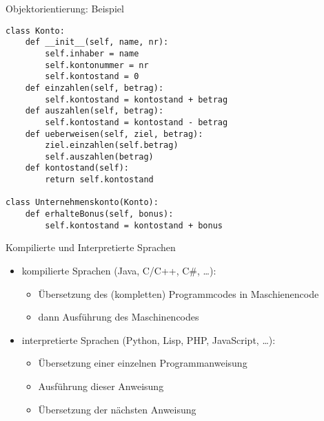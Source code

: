 \begin{frame}[fragile]{Objektorientierung: Beispiel}
    \begin{lstlisting}
class Konto:
    def __init__(self, name, nr):
        self.inhaber = name
        self.kontonummer = nr
        self.kontostand = 0
    def einzahlen(self, betrag):
        self.kontostand = kontostand + betrag
    def auszahlen(self, betrag):
        self.kontostand = kontostand - betrag
    def ueberweisen(self, ziel, betrag): 
        ziel.einzahlen(self.betrag)
        self.auszahlen(betrag)
    def kontostand(self):
        return self.kontostand

class Unternehmenskonto(Konto):
    def erhalteBonus(self, bonus):
        self.kontostand = kontostand + bonus
    \end{lstlisting}
\end{frame}

\begin{frame}[fragile]{Kompilierte und Interpretierte Sprachen}
    \begin{itemize}
        \item kompilierte Sprachen (Java, C/C++, C\#, \dots):
        \begin{itemize}
            \item Übersetzung des (kompletten) Programmcodes in Maschienencode
            \item dann Ausführung des Maschinencodes
        \end{itemize}
        \item interpretierte Sprachen (Python, Lisp, PHP, JavaScript, \dots):
        \begin{itemize}
            \item Übersetzung einer einzelnen Programmanweisung
            \item Ausführung dieser Anweisung
            \item Übersetzung der nächsten Anweisung
        \end{itemize}
    \end{itemize}
\end{frame}


